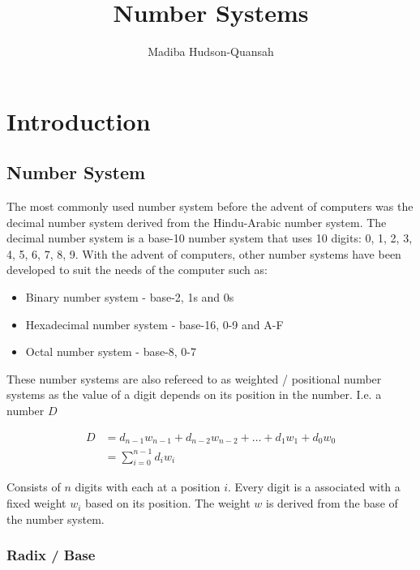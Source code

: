 \documentclass[12pt letter]{report}
\title{\Huge{Number Systems}}
\author{\huge{Madiba Hudson-Quansah}}
\date{}
\begin{document}
\maketitle
\newpage
{}
\tableofcontents
\pagebreak

\chapter{Introduction}

\section{Number System}

The most commonly used number system before the advent of computers was the decimal number system derived from the
Hindu-Arabic number system. The decimal number system is a base-10 number system that uses 10 digits: 0, 1, 2, 3, 4, 5,
6, 7, 8, 9. With the advent of computers, other number systems have been developed to suit the needs of the computer
such as:
\begin{itemize}
  \item Binary number system - base-2, 1s and 0s
  \item Hexadecimal number system - base-16, 0-9 and A-F
  \item Octal number system - base-8, 0-7
\end{itemize}

These number systems are also refereed to as weighted / positional number systems as the value of a digit depends on its
position in the number. I.e. a number $D$

\begin{align*}
  D & =  d_{n-1} w_{n-1} + d_{n-2} w_{n-2} + \ldots + d_1 w_1 + d_0 w_0 \\
    & =  \displaystyle\sum_{i=0}^{n-1} d_i w_i
\end{align*}

Consists of $n$ digits with each at a position $i$. Every digit is a associated with a fixed weight $w_i$ based on its
position. The weight $w$ is derived from the base of the number system.

\subsection{Radix / Base}
\end{document}
